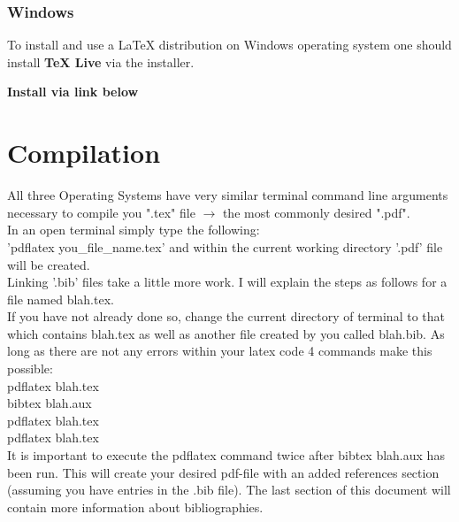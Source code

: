 \subsubsection{Windows}
To install and use a \LaTeX{} distribution on Windows 
operating system one should install \textbf{\TeX{} Live} 
via the installer.\\


\begin{center}
\textbf{Install via link below}\\
\end{center}


\section{Compilation}

All three Operating Systems have very similar terminal
command line arguments necessary to compile you ".tex"
file $\to$ the most commonly desired ".pdf".\\
In an open terminal simply type the following:\\
'pdflatex you\_file\_name.tex' and within the current
working directory '.pdf' file will be created.\\

Linking '.bib' files take a little more work. I will
explain the steps as follows for a file named 
blah.tex. \\ 

If you have not already done so, change the current
directory of terminal to that which contains blah.tex
as well as another file created by you called blah.bib.
As long as there are not any errors within your latex
code 4 commands make this possible:\\
pdflatex blah.tex \\
bibtex blah.aux \\
pdflatex blah.tex \\
pdflatex blah.tex\\

It is important to execute the pdflatex command twice
after bibtex blah.aux has been run.
This will create your desired pdf-file with an added
references section (assuming you have entries in the
.bib file). The last section of this document will 
contain more information about bibliographies. \\


